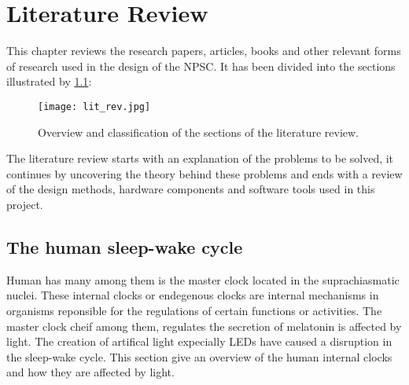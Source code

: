 \chapter{Literature Review}

This chapter reviews the research papers, articles, books and other relevant forms of research used in the design of the NPSC. It has been divided into the sections illustrated by \cref{fig:lit_rev}:
\begin{figure}[h!]
\centering
\texttt{[image: lit\_rev.jpg]}
\caption{Overview and classification of the sections of the literature review.}
\label{fig:lit_rev}
\end{figure}
The literature review starts with an explanation of the problems to be solved, it continues by uncovering the theory behind these problems and ends with a review of the design methods, hardware components and software tools used in this project.

\section{The human sleep-wake cycle}

Human has many  among them is the master clock located in the suprachiasmatic nuclei. These internal clocks or endegenous clocks are internal mechanisms in organisms reponsible for the regulations of certain functions or activities. The master clock cheif among them, regulates the secretion of melatonin is affected by light. The creation of artifical light expecially LEDs have caused a disruption in the sleep-wake cycle. This section give an overview of the human internal clocks and how they are affected by light.

